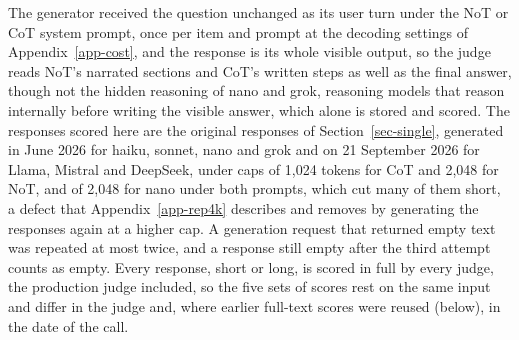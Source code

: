 The generator received the question unchanged as its user turn under the NoT
or CoT system prompt, once per item and prompt at the decoding settings of
Appendix~\ref{app-cost}, and the response is its whole visible output, so the
judge reads NoT's narrated sections and CoT's written steps as well as the
final answer, though not the hidden reasoning of nano and grok, reasoning
models that reason internally before writing the visible answer, which alone
is stored and scored. The responses scored here are the original responses
of Section~\ref{sec-single}, generated in June 2026 for haiku, sonnet, nano
and grok and on 21 September 2026 for Llama, Mistral and DeepSeek, under caps
of 1,024 tokens for CoT and 2,048 for NoT, and of 2,048 for nano under both
prompts, which cut many of them short, a defect that
Appendix~\ref{app-rep4k} describes and removes by generating the responses
again at a higher cap.
A generation request that returned empty text was
repeated at most twice, and a response still empty after the third attempt
counts as empty. Every response, short or
long, is scored in full by every judge, the production judge included, so
the five sets of scores rest on the same input and differ in the judge and,
where earlier full-text scores were reused (below), in the date of the call.
